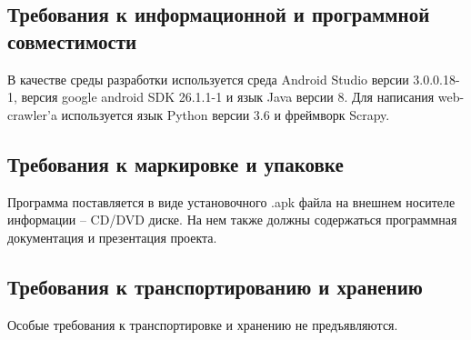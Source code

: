 \subsection{Требования к информационной и программной совместимости}
В качестве среды разработки используется среда Android Studio версии
3.0.0.18-1, версия google android SDK 26.1.1-1 и язык Java версии 8.
Для написания web-crawler'a используется язык Python версии 3.6 и 
фреймворк Scrapy.


\subsection{Требования к маркировке и упаковке}
Программа поставляется в виде установочного .apk файла на внешнем носителе
информации – CD/DVD диске. На нем также должны содержаться программная
документация и презентация проекта.

\subsection{Требования к транспортированию и хранению}
Особые требования к транспортировке и хранению не предъявляются.


